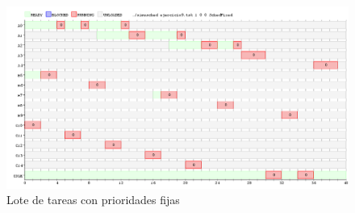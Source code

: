 \documentclass[a4paper,11pt]{article}
\begin{document}
\begin{figure}[H]
\centering
\includegraphics[scale=.6, width=1\textwidth]{graficos/ej9-fix}
\caption{Lote de tareas con prioridades fijas}
\end{figure}
\end{document}
